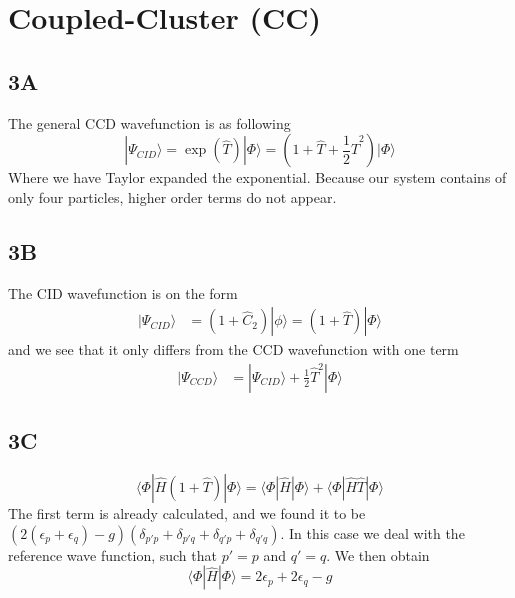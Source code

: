\documentclass[norsk,a4paper,12pt]{article}
\begin{document}
\newpage
\section{Coupled-Cluster (CC)}
\subsection*{3A}
The general CCD wavefunction is as following
\begin{equation}
|\Psi_{CID}\rangle=\exp{(\hat{T})}|\Phi\rangle=(1+\hat{T}+\frac{1}{2}\hat{T}^2)|\Phi\rangle
\end{equation}
Where we have Taylor expanded the exponential. Because our system contains of only four particles, higher order terms do not appear. 

\subsection*{3B}
The CID wavefunction is on the form
\begin{align}
|\Psi_{CID}\rangle&=(1+\hat{C}_2)|\phi\rangle=(1+\hat{T})|\Phi\rangle
\end{align}
and we see that it only differs from the CCD wavefunction with one term
\begin{align*}
|\Psi_{CCD}\rangle&=|\Psi_{CID}\rangle+\frac{1}{2}\hat{T}^2|\Phi\rangle
\end{align*}

\subsection*{3C}
\begin{equation*}
\langle \Phi|\hat{H}(1+\hat{T})|\Phi\rangle=\langle \Phi|\hat{H}|\Phi\rangle+\langle \Phi|\hat{H}\hat{T}|\Phi\rangle
\end{equation*}
The first term is already calculated, and we found it to be $(2(\epsilon_p+\epsilon_q)-g)(\delta_{p'p}+\delta_{p'q}+\delta_{q'p}+\delta_{q'q})$. In this case we deal with the reference wave function, such that $p'=p$ and $q'=q$. We then obtain
\begin{equation*}
\langle \Phi|\hat{H}|\Phi\rangle=2\epsilon_p+2\epsilon_q-g
\end{equation*}
\end{document}

